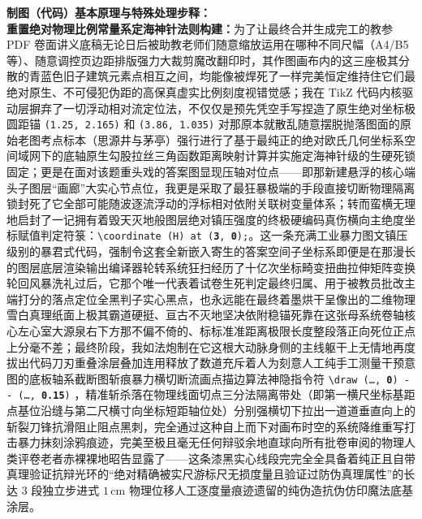 {\small\color{blue!70!black}
\textbf{制图（代码）基本原理与特殊处理步释：}\\
\textbf{重置绝对物理比例常量系定海神针法则构建：}为了让最终合并生成完工的教参 PDF 卷面讲义底稿无论日后被助教老师们随意缩放运用在哪种不同尺幅（A4/B5 等）、随意调控页边距排版强力大裁剪魔改翻印时，其作图画布内的这三座极其分散的青蓝色旧子建筑元素点相互之间，均能像被焊死了一样完美恒定维持住它们最绝对原生、不可侵犯伪距的高保真虚实比例刻度视错觉感；我在 TikZ 代码内核驱动层摒弃了一切浮动相对流定位法，不仅仅是预先凭空手写捏造了原生绝对坐标极圆距锚 \texttt{(1.25, 2.165)} 和 \texttt{(3.86, 1.035)} 对那原本就散乱随意摆脱抛落图面的原始老图考点标本（思源井与茅亭）强行进行了基于最纯正的绝对欧氏几何坐标系空间域网下的底轴原生勾股拉丝三角函数距离映射计算并实施定海神针级的生硬死锁固定；更是在面对该题重头戏的答案图显现压轴对位点——即那新建悬浮的核心端头子图层“画廊”大实心节点位，我更是采取了最狂暴极端的手段直接切断物理隔离锁封死了它全部可能随波逐流浮动的浮标相对依附关联树变量体系；转而蛮横无理地启封了一记拥有着毁天灭地般图层绝对镇压强度的终极硬编码真伤横向主绝度坐标赋值判定符箓：\texttt{\textbackslash coordinate (H) at (\textbf{3}, \textbf{0});}。这一条充满工业暴力图文镇压级别的暴君式代码，强制令这套全新嵌入寄生的答案空间子坐标系即便是在那漫长的图层底层渲染输出编译器轮转系统狂扫经历了十亿次坐标畸变扭曲拉伸矩阵变换轮回风暴洗礼过后，它那个唯一代表着试卷生死判定最终归属、用于被教员批改主端打分的落点定位全黑判子实心黑点，也永远能在最终着墨烘干呈像出的二维物理雪白真理纸面上极其霸道硬挺、亘古不灭地坚决依附稳锚死靠在这张母系统卷轴核心左心室大源泉右下方那不偏不倚的、标标准准距离极限长度整段落正向死位正点上分毫不差；最终阶段，我如法炮制在它这根大动脉身侧的主线躯干上无情地再度拔出代码刀刃重叠涂层叠加连用释放了数道充斥着人为刻意人工纯手工测量干预意图的底板轴系截断图斩痕暴力横切断流画点描边算法神隐指令符 \texttt{\textbackslash draw (\dots, \textbf{0}) -{}- (\dots, \textbf{0.15})} ，精准斩杀落在物理线面切点三分法隔离带处（即第一横尺坐标基距点基位沿缝与第二尺横寸向坐标短距轴位处）分别强横切下拉出一道道垂直向上的斩裂刀锋抗滑阻止阻点黑刺，完全通过这种自上而下对画布时空的系统降维重写打击暴力抹刻涂鸦痕迹，完美至极且毫无任何辩驳余地直球向所有批卷审阅的物理人类评卷老者赤裸裸地昭告显露了——这条漆黑实心线段完完全全具备着纯正且自带真理验证抗辩光环的“绝对精确被实尺游标尺无损度量且验证过防伪真理属性”的长达 $3$ 段独立步进式 $1\,\text{cm}$ 物理位移人工逐度量痕迹遗留的纯伪造抗伪仿印魔法底基涂层。
}

\newpage



